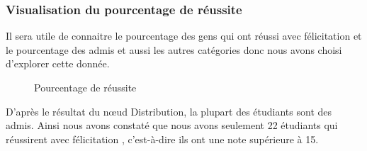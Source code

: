 \documentclass{article}
\begin{document}
            \subsubsection{Visualisation du pourcentage de réussite}
            Il sera utile de connaitre le pourcentage des gens qui ont réussi avec félicitation et le pourcentage des admis et aussi les autres catégories donc nous avons choisi d’explorer cette donnée.
            \begin{figure}[h!]
                \centering
                \caption{Pourcentage de réussite}
                \label{fig:6}
            \end{figure}
            D’après le résultat du nœud Distribution, la plupart des étudiants sont des admis. Ainsi nous avons constaté que nous avons seulement 22 étudiants qui réussirent avec félicitation , c’est-à-dire ils ont une note supérieure à 15.
\end{document}
